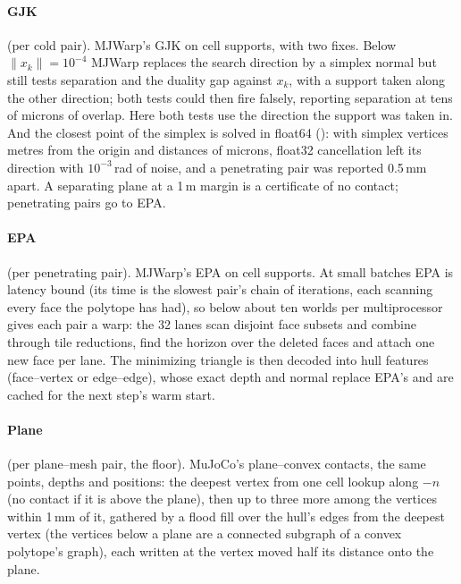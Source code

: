 \paragraph{GJK} (per cold pair). MJWarp's GJK on cell supports, with two fixes. Below $\lVert x_k\rVert = 10^{-4}$ MJWarp replaces the search direction by a simplex normal but still tests separation and the duality gap against $x_k$, with a support taken along the other direction; both tests could then fire falsely, reporting separation at tens of microns of overlap. Here both tests use the direction the support was taken in. And the closest point of the simplex is solved in float64 (): with simplex vertices metres from the origin and distances of microns, float32 cancellation left its direction with $10^{-3}$\,rad of noise, and a penetrating pair was reported 0.5\,mm apart. A separating plane at a 1\,\micro m margin is a certificate of no contact; penetrating pairs go to EPA.

\paragraph{EPA} (per penetrating pair). MJWarp's EPA on cell supports. At small batches EPA is latency bound (its time is the slowest pair's chain of iterations, each scanning every face the polytope has had), so below about ten worlds per multiprocessor  gives each pair a warp: the 32 lanes scan disjoint face subsets and combine through tile reductions, find the horizon over the deleted faces and attach one new face per lane. The minimizing triangle is then decoded into hull features (face--vertex or edge--edge), whose exact depth and normal replace EPA's and are cached for the next step's warm start.

\paragraph{Plane} (per plane--mesh pair, the floor). MuJoCo's plane--convex contacts, the same points, depths and positions: the deepest vertex from one cell lookup along $-n$ (no contact if it is above the plane), then up to three more among the vertices within 1\,mm of it, gathered by a flood fill over the hull's edges from the deepest vertex (the vertices below a plane are a connected subgraph of a convex polytope's graph), each written at the vertex moved half its distance onto the plane.

